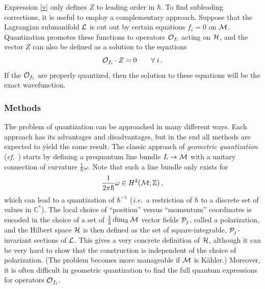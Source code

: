 \documentclass[letterpaper,12pt]{article}
\numberwithin{equation}{section}
\newcommand{\ie}{\emph{i.e.}}
\newcommand{\cf}{\emph{cf.}}
\newcommand{\be}{\begin{equation}}
\newcommand{\ee}{\end{equation}}
\newcommand{\R}{{\mathbb{R}}}
\newcommand{\C}{{\mathbb{C}}}
\newcommand{\Z}{{\mathbb{Z}}}
\newcommand{\CH}{{\cal H}}
\newcommand{\CL}{{\cal L}}
\newcommand{\CM}{{\cal M}}
\newcommand{\CO}{{\cal O}}
\newcommand{\CP}{{\cal P}}
\renewcommand{\=}{\;=\;}
\begin{document}
Expression \eqref{v} only defines $Z$ to leading order in $\hbar$. To find subleading corrections, it is useful to employ a complementary approach. Suppose that the Lagrangian submanifold $\CL$ is cut out by certain equations $f_i=0$ on $\CM$. Quantization promotes these functions to operators $\CO_{f_i}$ acting on $\CH$, and the vector $Z$ can also be defined as a solution to the equations
%
\be \CO_{f_i}\cdot Z = 0  \qquad\forall\; i\,. \ee
%
If the $\CO_{f_i}$ are properly quantized, then the solution to these equations will be the exact wavefunction.


\subsubsection{Methods}


The problem of quantization can be approached in many different ways.
Each approach has its advantages and disadvantages, but in the end all methods are expected to yield the same result.
The classic approach of \emph{geometric quantization} (\cf\ \cite{woodhouse-1992})
starts by defining a prequantum line bundle $L \to \CM$ with a unitary connection
of curvature $\frac{1}{\hbar}\omega$. Note that such a line bundle only exists for
%
\be \frac{1}{2\pi\hbar}\omega\in H^2(\CM;\Z)\,, \label{wquant} \ee
%
which can lead to a quantization of $\hbar^{-1}$ (\ie\ a restriction of $\hbar$ to a discrete set of values in $\C^*$).
The local choice of ``position'' versus ``momentum'' coordinates is encoded
in the choice of a set of $\frac12\dim_\R\CM$ vector fields $\CP_j$, called a polarization,
and the Hilbert space $\CH$ is then defined as the set of square-integrable,
$\CP_j$-invariant sections of $\CL$. This gives a very concrete definition of $\CH$,
although it can be very hard to show that the construction is independent of the choice of polarization.
(The problem becomes more manageable if $\CM$ is K\"ahler.)
Moreover, it is often difficult in geometric quantization
to find the full quantum expressions for operators $\CO_{f_i}$. \\
\end{document}
